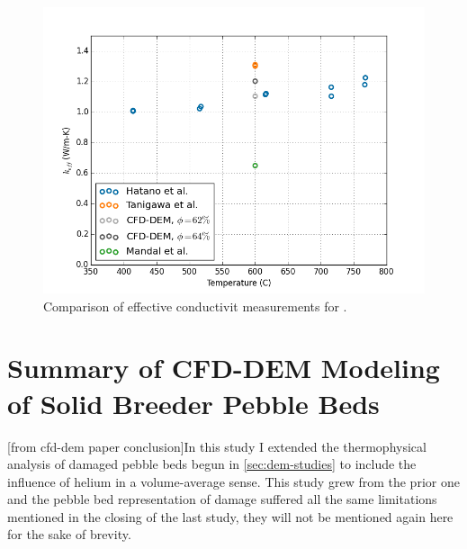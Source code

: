 \begin{figure}[ht]
\centering
    \includegraphics[width=\singleimagewidth]{figures/initial_packing_study/keff-he-comparisons.png}
    \caption{Comparison of effective conductivit measurements for \lit.}
    \label{fig:keff-cfd-comparisons}
\end{figure}














\FloatBarrier



%
%
\section{Summary of CFD-DEM Modeling of Solid Breeder Pebble Beds}
[from cfd-dem paper conclusion]In this study I extended the thermophysical analysis of damaged pebble beds begun in \cref{sec:dem-studies} to include the influence of helium in a volume-average sense. This study grew from the prior one and the pebble bed representation of damage suffered all the same limitations mentioned in the closing of the last study, they will not be mentioned again here for the sake of brevity.


